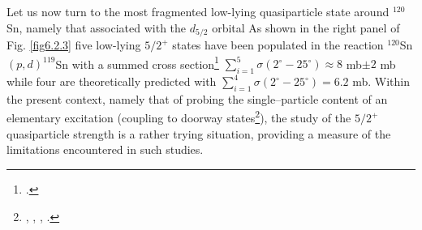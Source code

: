   Let us now turn to the most fragmented low-lying quasiparticle state around $^{120}$Sn, namely that associated with the $d_{5/2}$ orbital As shown in the right panel of Fig. \ref{fig6.2.3} five low-lying $5/2^+$ states have been populated in the 	reaction  $^{120}$Sn$(p,d)^{119}$Sn with a summed cross section\footnote{\cite{Dickey:82}.} $\sum_{i=1}^5 \sigma(2^\circ-25^\circ)\approx 8$ mb$\pm 2$ mb  while four are theoretically predicted with $\sum_{i=1}^4\sigma(2^\circ-25^\circ)= 6.2$ mb.
  Within the  present context, namely that of probing the single--particle 	content of an elementary excitation (coupling to doorway states\footnote{\cite{Feshbach:58}, \cite{Rawitscher:87}, \cite{Bortignon:81}, \cite{Bertsch:83}.}), the study of the $5/2^+$ quasiparticle strength is a rather trying situation, providing a measure of the limitations encountered in such studies. 
  
